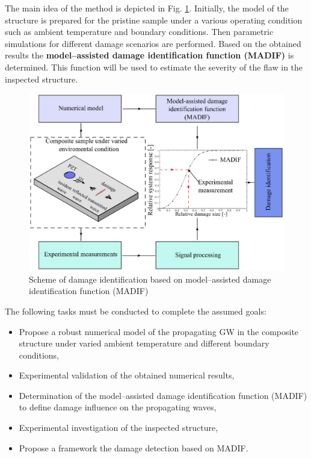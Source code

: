 \documentclass[a4paper,12pt]{article}
\begin{document}
The main idea of the method is depicted in Fig. \ref{fig:scheme}. Initially, the model of the structure is prepared for the pristine sample under a various operating condition such as ambient temperature and boundary conditions. Then parametric simulations for different damage scenarios are performed. Based on the obtained results the \textbf{model--assisted damage identification function (MADIF)} is determined. This function will be used to estimate the severity of the flaw in the inspected structure.
\begin{figure}
\includegraphics[width=1\textwidth]{../Figures/scheme.eps}
	\caption{Scheme of damage identification based on model--assisted damage identification function (MADIF)}
	\label{fig:scheme}
\end{figure}

The following tasks must be conducted to complete the assumed goals: 
\begin{itemize}
	\item Propose a robust numerical model of the propagating GW in the composite structure under varied ambient temperature and different boundary conditions,
	\item Experimental validation of the obtained numerical results,
	\item Determination of the model--assisted damage identification function (MADIF) to define damage influence on the propagating waves,
	\item Experimental investigation of the inspected structure,
	\item Propose a framework the damage detection based on MADIF.
\end{itemize}
\end{document}
